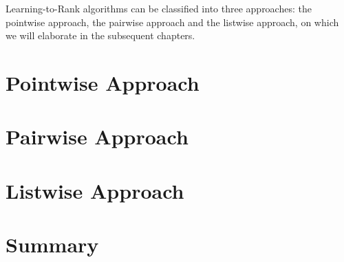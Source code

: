 Learning-to-Rank algorithms can be classified into three approaches: the pointwise approach, the pairwise approach and the listwise approach, on which we will elaborate in the subsequent chapters.

\chapter{Pointwise Approach}
\chapter{Pairwise Approach}
\chapter{Listwise Approach}
\chapter{Summary}